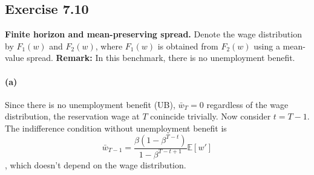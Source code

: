 \documentclass[11pt]{article}
\theoremstyle{definition}
\theoremstyle{boldtitle} %
\numberwithin{equation}{section}
\numberwithin{figure}{section}
\numberwithin{table}{section}
\begin{document}

\subsection{Exercise 7.10}
\textbf{Finite horizon and mean-preserving spread.}
Denote the wage distribution by $F_1(w)$ and $F_2(w)$, where $F_1(w)$ is obtained from $F_2(w)$ using a mean-value spread.
\textbf{Remark:} In this benchmark, there is no unemployment benefit.
\paragraph{(a)}
Since there is no unemployment benefit (UB), $\bar{w}_T = 0$ regardless of the wage distribution, 
the reservation wage at $T$ conincide trivially.
Now consider $t = T -1$.
The indifference condition without unemployment benefit is 
\[
\bar{w}_{T-1} = \frac{\beta (1 -\beta^{T-t})}{1 - \beta^{T-t+1}} \mathbb{E}[w']
\],
which doesn't depend on the wage distribution.
\end{document}
